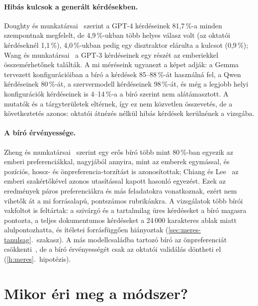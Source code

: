 \paragraph{Hibás kulcsok a generált kérdésekben.} Doughty és munkatársai~\cite{doughty2024comparative}
szerint a GPT-4 kérdéseinek 81,7\,\%-a minden szempontnak megfelelt, de 4,9\,\%-ukban több helyes válasz
volt (az oktatói kérdéseknél 1,1\,\%), 4,0\,\%-ukban pedig egy disztraktor elárulta a kulcsot (0,9\,\%); Wang és munkatársai~\cite{wang2022towards} a GPT-3
kérdéseinek egy részét az emberiekkel összemérhetőnek találták. A mi méréseink ugyanezt a képet adják: a
Gemma tervezett konfigurációiban a bíró a kérdések 85--88\,\%-át használná fel, a Qwen  kérdéseinek
80\,\%-át, a szervermodell  kérdéseinek 98\,\%-át, és még a legjobb helyi konfigurációk kérdéseinek
is 4--14\,\%-a a bíró szerint nem alátámasztott. A mutatók és a tárgyterületek eltérnek, így ez nem közvetlen
összevetés, de a következtetés azonos: oktatói átnézés nélkül hibás kérdések kerülnének a vizsgába.

\paragraph{A bíró érvényessége.} Zheng és munkatársai~\cite{zheng2023judge} szerint egy erős bíró több mint
80\,\%-ban egyezik az emberi preferenciákkal, nagyjából annyira, mint az emberek egymással, és pozíciós,
hossz- és önpreferencia-torzítást is azonosítottak; Chiang és Lee~\cite{chiang2023human} az emberi
szakértőkével azonos utasítással kapott hasonló egyezést. Ezek az eredmények páros preferenciákra és más
feladatokra vonatkoznak, ezért nem vihetők át a mi forrásalapú, pontszámos rubrikánkra. A vizsgálatok több
bírói vakfoltot is feltártak: a szivárgó és a tartalmilag üres kérdéseket a bíró magasra pontozta, a teljes
dokumentumos kérdéseket a 24\,000 karakteres ablak miatt alulpontozhatta, és ítéletei forrásfüggően
hiányoztak (\ref{sec:meres-tanulsag}.~szakasz). A más modellcsaládba tartozó bíró az önpreferenciát
csökkenti~\cite{panickssery2024selfpref}, de a bíró érvényességét csak az oktatói validálás döntheti el
(\ref{h:meres}.~hipotézis).

\section{Mikor éri meg a módszer?}
\label{sec:mikor}

